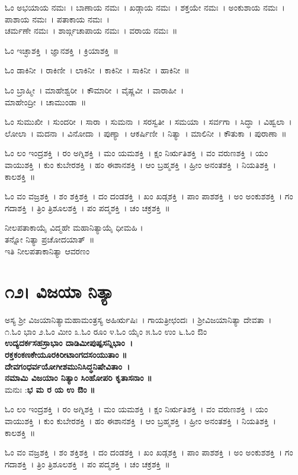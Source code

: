 ಓಂ ಅಭಯಾಯ ನಮಃ~।  ಬಾಣಾಯ ನಮಃ~।  ಖಡ್ಗಾಯ ನಮಃ~।  ಶಕ್ತಯೇ ನಮಃ~।  ಅಂಕುಶಾಯ ನಮಃ~।  ಪಾಶಾಯ ನಮಃ~।  ಪತಾಕಾಯ ನಮಃ~। \\ ಚರ್ಮಣೇ ನಮಃ~।  ಶಾರ್ಙ್ಗಚಾಪಾಯ ನಮಃ~।  ವರಾಯ ನಮಃ~॥

ಓಂ ಇಚ್ಛಾಶಕ್ತಿ~।  ಜ್ಞಾನಶಕ್ತಿ~।  ಕ್ರಿಯಾಶಕ್ತಿ~॥ 

ಓಂ ಡಾಕಿನೀ~।  ರಾಕಿಣೀ~।  ಲಾಕಿನೀ~।  ಕಾಕಿನೀ~।  ಸಾಕಿನೀ~।  ಹಾಕಿನೀ~॥ 

ಓಂ ಬ್ರಾಹ್ಮೀ~।  ಮಾಹೇಶ್ವರೀ~।  ಕೌಮಾರೀ~।  ವೈಷ್ಣವೀ~।  ವಾರಾಹೀ~। \\ ಮಾಹೇಂದ್ರೀ~।  ಚಾಮುಂಡಾ~॥ 

ಓಂ ಸುಮುಖೀ~।  ಸುಂದರೀ~।  ಸಾರಾ~।  ಸುಮನಾ~।  ಸರಸ್ವತೀ~।  ಸಮಯಾ~।  ಸರ್ವಗಾ~।  ಸಿದ್ಧಾ~।  ವಿಹ್ವಲಾ~।  ಲೋಲಾ~।  ಮದನಾ~।  ವಿನೋದಾ~।  ಪುಣ್ಯಾ~।  ಆಕರ್ಷಿಣೀ~।  ನಿತ್ಯಾ~।  ಮಾಲಿನೀ~।  ಕೌತುಕಾ~।  ಪುರಾಣಾ~॥ 

ಓಂ ಲಂ ಇಂದ್ರಶಕ್ತಿ~।  ರಂ ಅಗ್ನಿಶಕ್ತಿ~।  ಮಂ ಯಮಶಕ್ತಿ~।  ಕ್ಷಂ ನಿರ್ಋತಿಶಕ್ತಿ~।  ವಂ ವರುಣಶಕ್ತಿ~।  ಯಂ ವಾಯುಶಕ್ತಿ~।  ಕುಂ ಕುಬೇರಶಕ್ತಿ~।  ಹಂ ಈಶಾನಶಕ್ತಿ~।  ಆಂ ಬ್ರಹ್ಮಶಕ್ತಿ~।  ಹ್ರೀಂ ಅನಂತಶಕ್ತಿ~।  ನಿಯತಿಶಕ್ತಿ~।  ಕಾಲಶಕ್ತಿ~॥ 

ಓಂ ವಂ ವಜ್ರಶಕ್ತಿ~।  ಶಂ ಶಕ್ತಿಶಕ್ತಿ~।  ದಂ ದಂಡಶಕ್ತಿ~।  ಖಂ ಖಡ್ಗಶಕ್ತಿ~।  ಪಾಂ ಪಾಶಶಕ್ತಿ~।  ಅಂ ಅಂಕುಶಶಕ್ತಿ~।  ಗಂ ಗದಾಶಕ್ತಿ~।  ತ್ರಿಂ ತ್ರಿಶೂಲಶಕ್ತಿ~। ಪಂ ಪದ್ಮಶಕ್ತಿ~।  ಚಂ ಚಕ್ರಶಕ್ತಿ~॥

ನೀಲಪತಾಕಾಯೈ ವಿದ್ಮಹೇ ಮಹಾನಿತ್ಯಾಯೈ ಧೀಮಹಿ ।\\ತನ್ನೋ ನಿತ್ಯಾ ಪ್ರಚೋದಯಾತ್~॥\\
ಇತಿ ನೀಲಪತಾಕಾನಿತ್ಯಾ ಆವರಣಂ
\newpage
\section{೧೨। ವಿಜಯಾ ನಿತ್ಯಾ}
ಅಸ್ಯ ಶ್ರೀ ವಿಜಯಾನಿತ್ಯಾಮಹಾಮಂತ್ರಸ್ಯ ಅಹಿರ್ಋಷಿಃ~। ಗಾಯತ್ರೀಛಂದಃ~। ಶ್ರೀವಿಜಯಾನಿತ್ಯಾ ದೇವತಾ~।\\
೧.ಓಂ ಭಾಂ ೨.ಓಂ ಮೀಂ ೩.ಓಂ ರೂಂ ೪.ಓಂ ಯೈಂ ೫.ಓಂ ಉಂ ೬.ಓಂ ಔಂ \\
{\bfseries ಉದ್ಯದರ್ಕಸಹಸ್ರಾಭಾಂ ದಾಡಿಮೀಪುಷ್ಪಸನ್ನಿಭಾಂ~।\\
ರಕ್ತಕಂಕಣಕೇಯೂರಕಿರೀಟಾಂಗದಸಂಯುತಾಂ ॥\\
ದೇವಗಂಧರ್ವಯೋಗೀಶಮುನಿಸಿದ್ಧನಿಷೇವಿತಾಂ~।\\
ನಮಾಮಿ ವಿಜಯಾಂ ನಿತ್ಯಾಂ ಸಿಂಹೋಪರಿ ಕೃತಾಸನಾಂ ॥\\}
ಮನುಃ :{\bfseries  ಭ ಮ ರ ಯ ಉ ಔಂ ॥}

ಓಂ ಲಂ ಇಂದ್ರಶಕ್ತಿ~।  ರಂ ಅಗ್ನಿಶಕ್ತಿ~।  ಮಂ ಯಮಶಕ್ತಿ~।  ಕ್ಷಂ ನಿರ್ಋತಿಶಕ್ತಿ~।  ವಂ ವರುಣಶಕ್ತಿ~।  ಯಂ ವಾಯುಶಕ್ತಿ~।  ಕುಂ ಕುಬೇರಶಕ್ತಿ~।  ಹಂ ಈಶಾನಶಕ್ತಿ~।  ಆಂ ಬ್ರಹ್ಮಶಕ್ತಿ~।  ಹ್ರೀಂ ಅನಂತಶಕ್ತಿ~।  ನಿಯತಿಶಕ್ತಿ~।  ಕಾಲಶಕ್ತಿ~॥ 

ಓಂ ವಂ ವಜ್ರಶಕ್ತಿ~।  ಶಂ ಶಕ್ತಿಶಕ್ತಿ~।  ದಂ ದಂಡಶಕ್ತಿ~।  ಖಂ ಖಡ್ಗಶಕ್ತಿ~।  ಪಾಂ ಪಾಶಶಕ್ತಿ~।  ಅಂ ಅಂಕುಶಶಕ್ತಿ~।  ಗಂ ಗದಾಶಕ್ತಿ~।  ತ್ರಿಂ ತ್ರಿಶೂಲಶಕ್ತಿ~।  ಪಂ ಪದ್ಮಶಕ್ತಿ~।  ಚಂ ಚಕ್ರಶಕ್ತಿ~॥ 

